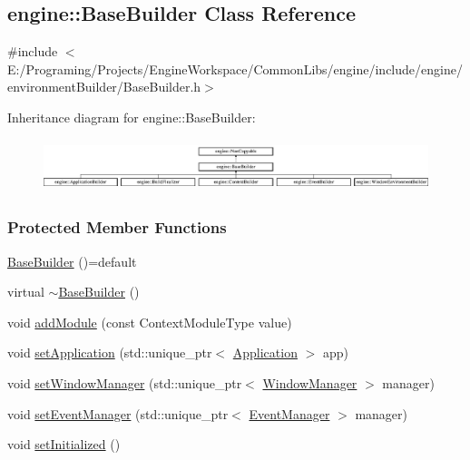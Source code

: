 \hypertarget{a00005}{}\subsection{engine\+:\+:Base\+Builder Class Reference}
\label{a00005}


{\ttfamily \#include $<$E\+:/\+Programing/\+Projects/\+Engine\+Workspace/\+Common\+Libs/engine/include/engine/environment\+Builder/\+Base\+Builder.\+h$>$}

Inheritance diagram for engine\+:\+:Base\+Builder\+:\begin{figure}[H]
\begin{center}
\leavevmode
\includegraphics[height=1.541284cm]{a00005}
\end{center}
\end{figure}
\subsubsection*{Protected Member Functions}
\begin{DoxyCompactItemize}
\item 
\hyperlink{a00005_ac1d22d4031be98e715d8ea733fc4463b}{Base\+Builder} ()=default
\item 
virtual \hyperlink{a00005_af762f3acae53396e0621113e1bb3156b}{$\sim$\+Base\+Builder} ()
\item 
void \hyperlink{a00005_a52fb449fadc5d3a074e3fc7bfb56744b}{add\+Module} (const Context\+Module\+Type value)
\item 
void \hyperlink{a00005_a20c5dafa6892142bc352c13a5f3ac09a}{set\+Application} (std\+::unique\+\_\+ptr$<$ \hyperlink{a00002}{Application} $>$ app)
\item 
void \hyperlink{a00005_a641fb06484bdb07220f445f14db8c0e7}{set\+Window\+Manager} (std\+::unique\+\_\+ptr$<$ \hyperlink{a00087}{Window\+Manager} $>$ manager)
\item 
void \hyperlink{a00005_a52b490a3ef4d2a5b5b7e8e0f82d9a27c}{set\+Event\+Manager} (std\+::unique\+\_\+ptr$<$ \hyperlink{a00034}{Event\+Manager} $>$ manager)
\item 
void \hyperlink{a00005_af23e3bdfb30ca9f2076cacc9029d96c2}{set\+Initialized} ()
\end{DoxyCompactItemize}


